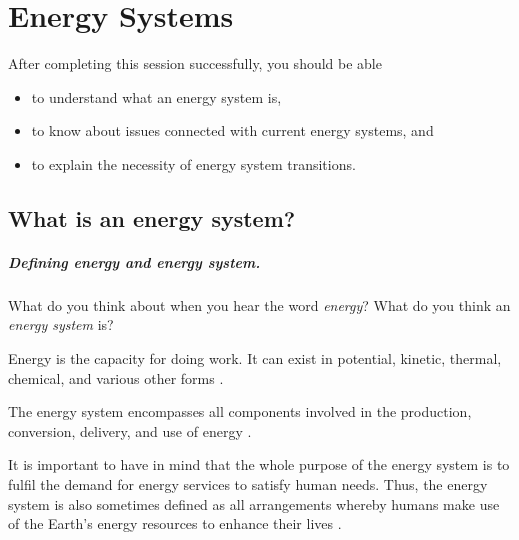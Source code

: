 \setchapterpreamble[u]{\margintoc}
\chapter{Energy Systems}


After completing this session successfully, you should be able

\begin{itemize}
\item to understand what an energy system is,
\item to know about issues connected with current energy systems, and
\item to explain the necessity of energy system transitions.
\end{itemize}


\section{What is an energy system?}

\paragraph*{Defining energy and energy system.}

\begin{kaobox}[frametitle=Task]
What do you think about when you hear the word \textit{energy}? What do you think an \textit{energy system} is?
\end{kaobox}

\begin{definition}
Energy is the capacity for doing work. It can exist in potential, kinetic, thermal, chemical, and various other forms .
\end{definition}

\begin{definition}
The energy system encompasses all components involved in the production, conversion, delivery, and use of energy .
\end{definition}

It is important to have in mind that the whole purpose of the energy system is to fulfil the demand for energy services to satisfy human needs. Thus, the energy system is also sometimes defined as all arrangements whereby humans make use of the Earth’s energy resources to enhance their lives .

